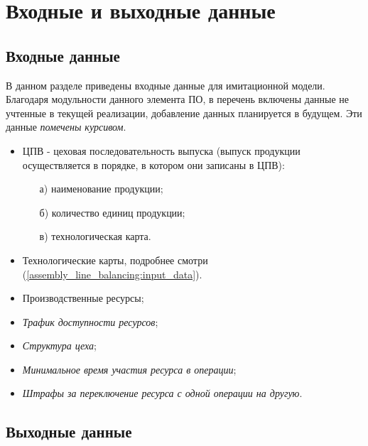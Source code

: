 \section{Входные и выходные данные}

\subsection{Входные данные}
В данном разделе приведены входные данные для имитационной модели. Благодаря модульности данного элемента ПО, в перечень включены данные не учтенные в текущей реализации, добавление данных планируется в будущем. Эти данные \textit{помечены курсивом}.

\begin{itemize}
	\item ЦПВ - цеховая последовательность выпуска (выпуск продукции осуществляется в порядке, в котором они записаны в ЦПВ):
		\begin{itemize}
			\item[а)] наименование продукции;
			\item[б)] количество единиц продукции;	
			\item[в)] технологическая карта.
		\end{itemize}			
	\item Технологические карты, подробнее смотри (\ref{assembly_line_balancing:input_data}).
	\item Производственные ресурсы;
	\item \textit{Трафик доступности ресурсов};
	\item \textit{Структура цеха};
	\item \textit{Минимальное время участия ресурса в операции};
	\item \textit{Штрафы за переключение ресурса с одной операции на другую}. 
\end{itemize}

\subsection{Выходные данные}

